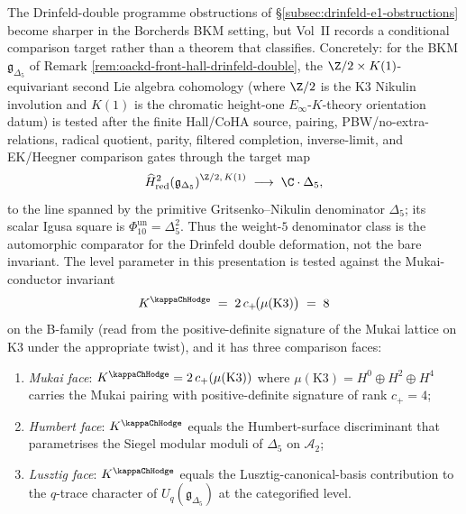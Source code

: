 \begin{remark}[Conditional $H^2$ comparator and the three faces of
$K^{\kappaChHodge} = 8$]
\label{rem:oackd-front-classification-K-kappa}
%
%
%
%
%
The Drinfeld-double programme obstructions of
\S\ref{subsec:drinfeld-e1-obstructions} become sharper in
the Borcherds BKM setting, but Vol~II records a conditional
comparison target rather than a theorem that classifies. Concretely:
for the BKM $\mathfrak{g}_{\Delta_5}$ of Remark
\ref{rem:oackd-front-hall-drinfeld-double}, the $\Z/2
\times K(1)$-equivariant second Lie algebra cohomology
(where $\Z/2$ is the K3 Nikulin involution and $K(1)$ is
the chromatic height-one $E_\infty$-$K$-theory orientation
datum) is tested after the finite Hall/CoHA source, pairing,
PBW/no-extra-relations, radical quotient, parity, filtered completion,
inverse-limit, and EK/Heegner comparison gates through the target map
\[
 \widehat H^2_{\mathrm{red}}\!
   \left(\mathfrak{g}_{\Delta_5}\right)^{\Z/2,\,K(1)}
 \;\longrightarrow\;
 \C \cdot \Delta_5,
\]
to the line spanned by the primitive Gritsenko--Nikulin denominator
$\Delta_5$; its scalar Igusa square is
$\Phi_{10}^{\mathrm{un}}=\Delta_5^2$. Thus the weight-$5$
denominator class is the automorphic comparator for the Drinfeld
double deformation, not the bare invariant. The level parameter
in this presentation is tested against the Mukai-conductor invariant
\[
 K^{\kappaChHodge}
 \;=\;
 2\, c_+\!\bigl(\mu(\mathrm{K3})\bigr)
 \;=\;
 8
\]
on the B-family (read from the positive-definite signature of
the Mukai lattice on K3 under the appropriate twist), and it
has three comparison faces:
\begin{enumerate}[label=\textup{(F\arabic*)}, leftmargin=*]
\item \emph{Mukai face}: $K^{\kappaChHodge} =
 2\,c_+(\mu(\mathrm{K3}))$ where $\mu(\mathrm{K3}) =
 H^0 \oplus H^2 \oplus H^4$ carries the Mukai pairing
 with positive-definite signature of rank $c_+ = 4$;
\item \emph{Humbert face}: $K^{\kappaChHodge}$
 equals the Humbert-surface discriminant that parametrises
 the Siegel modular moduli of $\Delta_5$ on
 $\mathcal{A}_2$;
\item \emph{Lusztig face}: $K^{\kappaChHodge}$
 equals the Lusztig-canonical-basis contribution to the
 $q$-trace character of $U_q(\mathfrak{g}_{\Delta_5})$
 at the categorified level.

\end{enumerate}
\end{remark}
